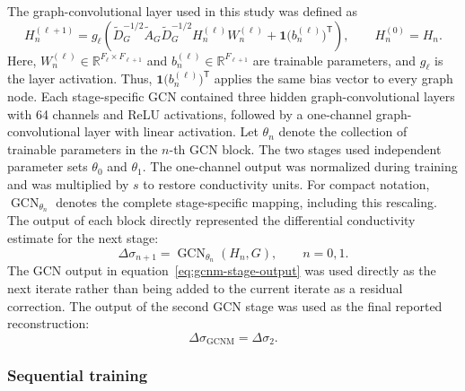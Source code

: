 \documentclass[11pt]{article}
\begin{document}
The graph-convolutional layer used in this study was defined as
\begin{equation*}
H_n^{(\ell+1)}
=
g_\ell\!\left(
\widetilde D_G^{-1/2}
\widetilde A_G
\widetilde D_G^{-1/2}
H_n^{(\ell)}
W_n^{(\ell)}
+
\mathbf{1}\bigl(b_n^{(\ell)}\bigr)^{\mathsf T}
\right),
\qquad
H_n^{(0)}=H_n.
\end{equation*}
Here, \(W_n^{(\ell)}\in\mathbb{R}^{F_\ell\times F_{\ell+1}}\) and \(b_n^{(\ell)}\in\mathbb{R}^{F_{\ell+1}}\) are trainable parameters, and \(g_\ell\) is the layer activation.
Thus, \(\mathbf{1}\bigl(b_n^{(\ell)}\bigr)^{\mathsf T}\) applies the same bias vector to every graph node.
Each stage-specific GCN contained three hidden graph-convolutional layers with 64 channels and ReLU activations, followed by a one-channel graph-convolutional layer with linear activation.
Let \(\theta_n\) denote the collection of trainable parameters in the \(n\)-th GCN block.
The two stages used independent parameter sets \(\theta_0\) and \(\theta_1\).
The one-channel output was normalized during training and was multiplied by $s$ to restore conductivity units.
For compact notation, $\operatorname{GCN}_{\theta_n}$ denotes the complete stage-specific mapping, including this rescaling.
The output of each block directly represented the differential conductivity estimate for the next stage:
\begin{equation}
    \Delta\sigma_{n+1}
    =
    \operatorname{GCN}_{\theta_n}\!\left(H_n,G\right),
    \qquad
    n=0,1.
\label{eq:gcnm-stage-output}
\end{equation}
The GCN output in equation~\eqref{eq:gcnm-stage-output} was used directly as the next iterate rather than being added to the current iterate as a residual correction.
The output of the second GCN stage was used as the final reported reconstruction:
\begin{equation*}
    \Delta\sigma_{\mathrm{GCNM}}
    =
    \Delta\sigma_2.
\end{equation*}

\subsubsection{Sequential training}
\end{document}
